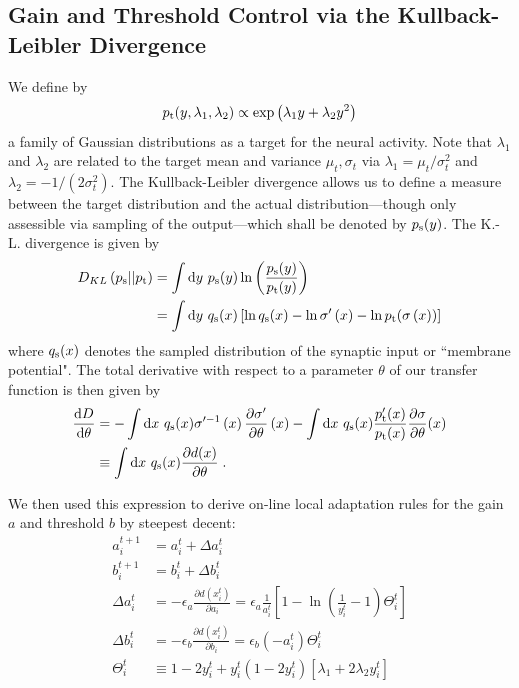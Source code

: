 \documentclass[10pt,a4paper]{article}
\newcommand{\diff}[1]{\mathrm{d}#1}
\newcommand{\psample}{p_{\rm s}}
\newcommand{\qsample}{q_{\rm s}}
\newcommand{\ptarget}{p_{\rm t}}
\begin{document}
\subsection{Gain and Threshold Control via the Kullback-Leibler Divergence}
We define by
\begin{equation}
\ptarget (y,\lambda_1,\lambda_2 ) \propto \exp\left(\lambda_1 y + \lambda_2 y^2\right)
\end{equation}
a family of Gaussian distributions as a target for the neural activity. Note that $\lambda_1$ and $\lambda_2$ are related to the target mean and variance $\mu_t,\sigma_t$ via $\lambda_1 = \mu_t/\sigma_t^2$ and $\lambda_2 = -1/\left(2 \sigma_t^2\right)$. The Kullback-Leibler divergence allows us to define a measure between the target distribution and the actual distribution---though only assessible via sampling of the output---which shall be denoted by $\psample (y)$. The K.-L. divergence is given by
\begin{align}
D_{KL}\left(p_{\rm s}||p_{\rm t}\right) &= \int \diff{y} \ \psample (y) \ln \left( \frac{\psample (y)}{\ptarget (y)} \right) \\
&= \int \diff{y} \ \qsample (x) \left[ \ln \qsample (x) - \ln\sigma '\left(x\right) - \ln \ptarget (\sigma\left(x\right)) \right]
\end{align}
where $\qsample (x)$ denotes the sampled distribution of the synaptic input or ``membrane potential". The total derivative with respect to a parameter $\theta$ of our transfer function is then given by
\begin{align}
\frac{\diff{D}}{\diff{\theta}} &= -\int \diff{x} \ \qsample (x) \sigma'^{-1} \left(x\right) \frac{\partial \sigma'}{\partial \theta} \left( x\right) - \int \diff{x} \ \qsample (x) \frac{\ptarget'(x)}{ \ptarget(x)} \frac{\partial \sigma}{\partial \theta} (x) \\
&\equiv \int \diff{x} \ \qsample (x) \frac{\partial d(x)}{\partial \theta} \; .
\end{align}

We then used this expression to derive on-line local adaptation rules for the gain $a$ and threshold $b$ by steepest decent:
\begin{align}
a^{t+1}_i &= a^t_i + \Delta a^t_i \\
b^{t+1}_i &= b^t_i + \Delta b^t_i \\
\Delta a^t_i &= - \epsilon_a \frac{\partial d(x^t_i)}{\partial a_i} = \epsilon_a \frac{1}{a^t_i}\left[ 1 - \ln \left( \frac{1}{y^t_i} - 1 \right) \Theta^t_i \right] \\
\Delta b^t_i &= - \epsilon_b \frac{\partial d(x^t_i)}{\partial b_i} = \epsilon_b \left(-a^t_i\right) \Theta^t_i \\
\Theta^t_i &\equiv 1-2y^t_i + y^t_i (1-2y^t_i)[\lambda_1 + 2\lambda_2 y^t_i] \label{eq:theta}
\end{align}
\end{document}
